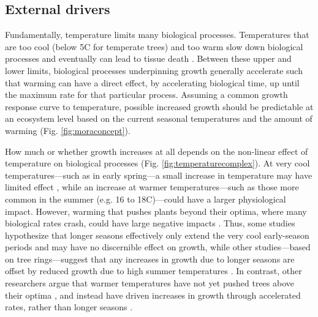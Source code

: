\documentclass[11pt]{article}
\begin{document}
\subsection*{External drivers}

Fundamentally, temperature limits many biological processes. Temperatures that are too cool (below 5\degree C for temperate trees) and too warm \citep[an area of active research, but likely between 35-45\degree C;][]{martinez2008hot,cabon2022cross} slow down biological processes and eventually can lead to tissue death \citep[see Fig. \ref{fig:temperaturecomplex},][]{larcher1980,kramer2012book}. Between these upper and lower limits, biological processes underpinning growth generally accelerate such that warming can have a direct effect, by accelerating biological time, up until the maximum rate for that particular process. Assuming a common growth response curve to temperature, possible increased growth should be predictable at an ecosystem level based on the current seasonal temperatures and the amount of warming (Fig. \ref{fig:moraconcept}). 

How much or whether growth increases at all depends on the non-linear effect of temperature on biological processes (Fig. \ref{fig:temperaturecomplex}). At very cool temperatures---such as in early spring---a small increase in temperature may have limited effect \citep[or even increase frost risk through early budburst, Fig. \ref{fig:hypotheses}e,][]{cat2021pep}, while an increase at warmer temperatures---such as those more common in the summer (e.g. 16 to 18\degree C)---could have a larger physiological impact. However, warming that pushes plants beyond their optima, where many biological rates crash, could have large negative impacts \citep{nobel1983biophysical,leuning2002temperature}. Thus, some studies hypothesize that longer seasons effectively only extend the very cool early-season periods and may have no discernible effect on growth, while other studies---based on tree rings---suggest that any increases in growth due to longer seasons are offset by reduced growth due to high summer temperatures \citep[Fig. \ref{fig:hypotheses},][]{gantois2022new,dow2022warm}. In contrast, other researchers argue that warmer temperatures have not yet pushed trees above their optima \citep{schaber2002evaluation}, and instead have driven increases in growth through accelerated rates, rather than longer seasons \citep[e.g.][]{ren2019}. 
\end{document}
